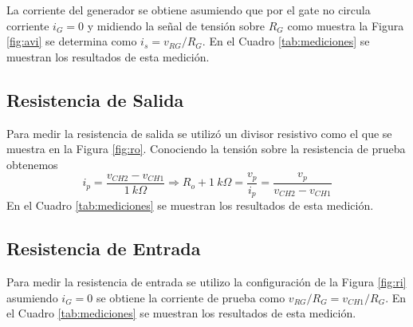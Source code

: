 \documentclass[a4paper, 10pt, spanish]{article}
\begin{document}
La corriente del generador se obtiene asumiendo que por el gate no circula corriente $i_G = 0$ y midiendo la señal de tensión sobre $R_G$ como muestra la Figura \ref{fig:avi} se determina como $i_s = v_{RG}/R_G$. En el Cuadro \ref{tab:mediciones} se muestran los resultados de esta medición.

\subsection{Resistencia de Salida}

Para medir la resistencia de salida se utilizó un divisor resistivo como el que se muestra en la Figura \ref{fig:ro}. Conociendo la tensión sobre la resistencia de prueba obtenemos
\begin{equation}
	i_p = \frac{v_{CH2}-v_{CH1}}{1\ k\Omega} \Rightarrow R_o + 1\ k\Omega = \frac{v_p}{i_p} = \frac{v_p}{v_{CH2}-v_{CH1}}
	\end{equation}
En el Cuadro \ref{tab:mediciones} se muestran los resultados de esta medición.

\subsection{Resistencia de Entrada}

Para medir la resistencia de entrada se utilizo la configuración de la Figura \ref{fig:ri} asumiendo $i_G = 0$ se obtiene la corriente de prueba como $v_{RG}/R_G = v_{CH1}/R_G$.
En el Cuadro \ref{tab:mediciones} se muestran los resultados de esta medición.
\end{document}
